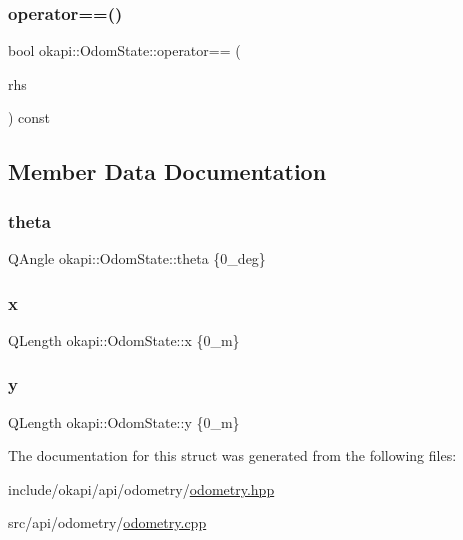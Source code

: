 \mbox{\label{structokapi_1_1OdomState_a17668afbbe39bcc745233a679aa917de}} 
\subsubsection{\texorpdfstring{operator==()}{operator==()}}
{\footnotesize\ttfamily bool okapi\+::\+Odom\+State\+::operator== (\begin{DoxyParamCaption}\item[{const \mbox{\hyperlink{structokapi_1_1OdomState}{Odom\+State}} \&}]{rhs }\end{DoxyParamCaption}) const}



\subsection{Member Data Documentation}
\mbox{\label{structokapi_1_1OdomState_a7d9c4f949e7ce0dd000c08318e61b921}} 
\subsubsection{\texorpdfstring{theta}{theta}}
{\footnotesize\ttfamily Q\+Angle okapi\+::\+Odom\+State\+::theta \{0\+\_\+deg\}}

\mbox{\label{structokapi_1_1OdomState_a53fbbb483d5073e703517745d769eb45}} 
\subsubsection{\texorpdfstring{x}{x}}
{\footnotesize\ttfamily Q\+Length okapi\+::\+Odom\+State\+::x \{0\+\_\+m\}}

\mbox{\label{structokapi_1_1OdomState_afcb08739959ad3afb7941a0bd59bcbb6}} 
\subsubsection{\texorpdfstring{y}{y}}
{\footnotesize\ttfamily Q\+Length okapi\+::\+Odom\+State\+::y \{0\+\_\+m\}}



The documentation for this struct was generated from the following files\+:\begin{DoxyCompactItemize}
\item 
include/okapi/api/odometry/\mbox{\hyperlink{odometry_8hpp}{odometry.\+hpp}}\item 
src/api/odometry/\mbox{\hyperlink{odometry_8cpp}{odometry.\+cpp}}\end{DoxyCompactItemize}
